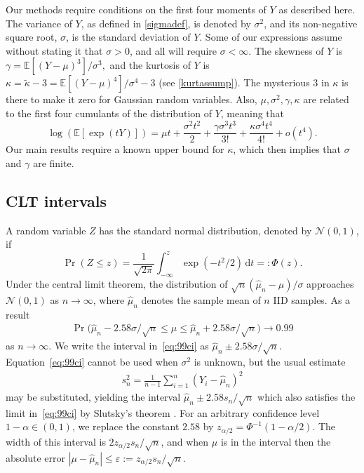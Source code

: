 \documentclass[graybox]{svmult}
\newcommand\e{\mathbb{E}}
\newcommand{\rd}{\,\mathrm{d}}
\newcommand{\dnorm}{\mathcal{N}}
\newcommand{\hmu}{\hat{\mu}}
\newcommand{\tkappa}{\tilde{\kappa}}
\begin{document}
Our methods require conditions on the first four moments of
$Y$ as described here. The variance of $Y$, as defined in \eqref{sigmadef}, is denoted by $\sigma^2$, and its non-negative square root, $\sigma$, is the standard deviation of $Y$.   Some of our expressions assume without stating it that $\sigma>0$, and all will require $\sigma<\infty$.  The skewness of $Y$ is
$ \gamma = \e[ (Y-\mu)^3 ]/\sigma^3,$
and the kurtosis of $Y$ is
$ \kappa = \tkappa-3 = \e[(Y-\mu)^4]/\sigma^4-3$ (see \eqref{kurtassump}).
The mysterious $3$ in $\kappa$ is there to
make it zero for Gaussian random variables.
Also, $\mu,\sigma^2,\gamma,\kappa$ are related to the
first four cumulants \cite[Chap.\ 2]{McC87a} of the distribution of $Y$, meaning that
\[
\log(\e[\exp(tY)]) = \mu t + \frac{\sigma^2 t^2}{2} + \frac{ \gamma \sigma^3t^3}{3!} + \frac{\kappa \sigma^4 t^4}{4!} + o(t^4).
\]
Our main results require a known upper bound for $\kappa$, which then implies that $\sigma$ and $\gamma$ are finite.

\subsection{CLT intervals}

A random variable $Z$ has the standard normal distribution,
denoted by $\dnorm(0,1)$, if 
$$\Pr( Z\le z ) = \frac1{\sqrt{2\pi}}\int_{-\infty}^z
\exp(-t^2/2)\rd t =: \Phi(z).$$
Under the central limit theorem,
the distribution of $\sqrt{n}(\hat\mu_n-\mu)/\sigma$
approaches $\dnorm(0,1)$ 
as $n\to\infty$, where $\hmu_n$ denotes the sample mean of $n$ IID samples.
As a result
\begin{align}\label{eq:99ci}
\Pr\bigl(
\hat\mu_n-2.58\sigma/\sqrt{n}
\le \mu\le
\hat\mu_n+2.58\sigma/\sqrt{n}\bigr)
\to 0.99
\end{align}
as $n\to\infty$.
We write the interval in~\eqref{eq:99ci}
as $\hat\mu_n\pm 2.58\sigma/\sqrt{n}$.
Equation~\eqref{eq:99ci} cannot be used when
$\sigma^2$ is unknown, but the usual estimate
\begin{align}\label{eq:samplevar}
s^2_n = \frac1{n-1}\sum_{i=1}^n(Y_i-\hat\mu_n)^2
\end{align}
may be substituted, yielding the interval
$\hat\mu_n\pm2.58s_n/\sqrt{n}$ which also
satisfies the limit in~\eqref{eq:99ci}
by Slutsky's theorem \citep{LehRom01a}. For an arbitrary
confidence level $1-\alpha\in(0,1)$, we replace
the constant $2.58$ by $z_{\alpha/2}=\Phi^{-1}(1-\alpha/2)$.
The width of this interval is
$2z_{\alpha/2}s_n/\sqrt{n}$, and when $\mu$ is in
the interval then the absolute error
$|\mu-\hat\mu_n|\le 
\varepsilon := z_{\alpha/2}s_n/\sqrt{n}$.
\end{document}
